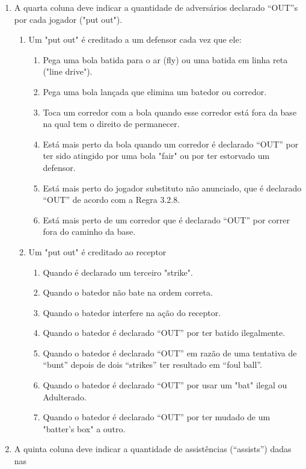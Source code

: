 \begin{multicols}{2}
\begin{enumerate}[label= \arabic*)]
		\item A quarta coluna deve indicar a quantidade de adversários declarado “OUT”s por
		cada jogador ("put out").
		\begin{enumerate}[label= (\alph*)]
			\item Um "put out" é creditado a um defensor cada vez que ele:
			\begin{enumerate}[label= (\arabic*)]
				\item Pega uma bola batida para o ar (\gls{fly}) ou uma batida em linha reta ("line drive").
				\item Pega uma bola lançada que elimina um batedor ou corredor.
				\item Toca um corredor com a bola quando esse corredor está fora da base na qual tem o direito de permanecer.
				\item Está mais perto da bola quando um corredor é declarado “OUT” por ter sido
				atingido por uma bola "fair" ou por ter estorvado um defensor.
				\item Está mais perto do jogador substituto não anunciado, que é declarado “OUT” de
				acordo com a Regra 3.2.8.
				\item Está mais perto de um corredor que é declarado “OUT” por correr fora do caminho da base.
			\end{enumerate}
			\item Um "put out" é creditado ao receptor
			\begin{enumerate}[label= (\arabic*)]
				\item Quando é declarado um terceiro "strike".
				\item Quando o batedor não bate na ordem correta.
				\item Quando o batedor interfere na ação do receptor.
				\item Quando o batedor é declarado “OUT” por ter batido ilegalmente.
				\item  Quando o batedor é declarado “OUT” em razão de uma tentativa de “bunt” depois de dois “strikes” ter resultado em “foul ball”.
				\item Quando o batedor é declarado “OUT” por usar um "bat" ilegal ou Adulterado.
				\item Quando o batedor é declarado “OUT” por ter mudado de um "batter's box" a outro.
			\end{enumerate}
		\end{enumerate}
		\item A quinta coluna deve indicar a quantidade de assistências (“assists”) dadas nas

\end{enumerate}
\end{multicols}
